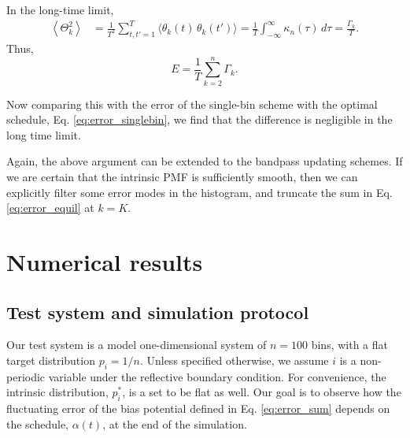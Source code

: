 \documentclass[reprint, floatfix]{revtex4-1}
\begin{document}
In the long-time limit,
\begin{align*}
  \left\langle
    \Theta_k^2
  \right\rangle
  &=
  \frac{1}{T^2}
  \sum_{ t, t' = 1 }^T
  \langle \theta_k(t) \, \theta_k(t') \rangle
  =
  \frac{1}{T}
  \int_{-\infty}^\infty
  \kappa_n(\tau) \, d\tau
  =
  \frac{ \Gamma_k }{ T }
.
\end{align*}
%
Thus,
\begin{equation}
  E
  =
  \frac{ 1 } { T }
  \sum_{ k = 2 }^n \Gamma_k
  .
\label{eq:error_equil}
\end{equation}

Now comparing this with the error of the single-bin scheme
with the optimal schedule,
Eq. \eqref{eq:error_singlebin},
we find that the difference is negligible
in the long time limit.

Again, the above argument can be extended
to the bandpass updating schemes.
%
If we are certain that
the intrinsic PMF is sufficiently smooth,
then we can explicitly filter some error modes
in the histogram, and truncate the sum in
Eq. \eqref{eq:error_equil} at $k = K$.





\section{\label{sec:results}
Numerical results}



\subsection{Test system and simulation protocol}


Our test system is
a model one-dimensional system
of $n = 100$ bins,
with a flat target distribution
$p_i = 1/n$.
%
Unless specified otherwise,
we assume $i$ is a non-periodic variable
under the reflective boundary condition.
%
For convenience,
the intrinsic distribution, $p^*_i$,
is a set to be flat as well.
%
Our goal is to observe how the fluctuating error
of the bias potential defined in Eq. \eqref{eq:error_sum}
depends on the schedule, $\alpha(t)$,
at the end of the simulation.
\end{document}
